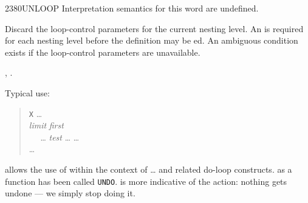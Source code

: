 \vspace*{-3ex}
\enlargethispage{8ex}
\begin{worddef}{2380}{UNLOOP}
\interpret
	Interpretation semantics for this word are undefined.

\execute
	\stack{}{}

	Discard the loop-control parameters for the current nesting
	level. An  is required for each nesting level
	before the definition may be ed. An ambiguous
	condition exists if the loop-control parameters are unavailable.

\see {},
	.

	\begin{rationale} %
		Typical use:
		\begin{quote}
			\word{:} \texttt{X} {\ldots} \\
			\tab \emph{limit} \emph{first}  \\
			\tab~~ {\ldots} \emph{test} 
				{\ldots}    {\ldots} \\
			\tab {} {\ldots} \\
			\word{;}
		\end{quote}

		 allows the use of  within the context
		of  {\ldots}  and related do-loop constructs.
		 as a function has been called \texttt{UNDO}.
		 is more indicative of the action: nothing gets
		undone --- we simply stop doing it.
	\end{rationale}

	\begin{testing} %
		 \\
		 \\
		 \\
	\end{testing}
\end{worddef}

